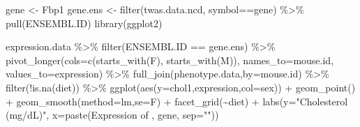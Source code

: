 \documentclass[
]{article}
\newenvironment{Shaded}{\begin{snugshade}}{\end{snugshade}}
\newcommand{\AttributeTok}[1]{\textcolor[rgb]{0.77,0.63,0.00}{#1}}
\newcommand{\FunctionTok}[1]{\textcolor[rgb]{0.00,0.00,0.00}{#1}}
\newcommand{\NormalTok}[1]{#1}
\newcommand{\OtherTok}[1]{\textcolor[rgb]{0.56,0.35,0.01}{#1}}
\newcommand{\SpecialCharTok}[1]{\textcolor[rgb]{0.00,0.00,0.00}{#1}}
\newcommand{\StringTok}[1]{\textcolor[rgb]{0.31,0.60,0.02}{#1}}
\begin{document}
\begin{Shaded}
\begin{Highlighting}[]
\NormalTok{gene }\OtherTok{\textless{}{-}} \StringTok{\textquotesingle{}Fbp1\textquotesingle{}}
\NormalTok{gene.ens }\OtherTok{\textless{}{-}} \FunctionTok{filter}\NormalTok{(twas.data.ncd, symbol}\SpecialCharTok{==}\NormalTok{gene) }\SpecialCharTok{\%\textgreater{}\%} \FunctionTok{pull}\NormalTok{(ENSEMBL.ID)}
\FunctionTok{library}\NormalTok{(ggplot2)}

\NormalTok{expression.data }\SpecialCharTok{\%\textgreater{}\%}
  \FunctionTok{filter}\NormalTok{(ENSEMBL.ID }\SpecialCharTok{==}\NormalTok{ gene.ens) }\SpecialCharTok{\%\textgreater{}\%}
  \FunctionTok{pivot\_longer}\NormalTok{(}\AttributeTok{cols=}\FunctionTok{c}\NormalTok{(}\FunctionTok{starts\_with}\NormalTok{(}\StringTok{\textquotesingle{}F\textquotesingle{}}\NormalTok{),}
                      \FunctionTok{starts\_with}\NormalTok{(}\StringTok{\textquotesingle{}M\textquotesingle{}}\NormalTok{)),}
               \AttributeTok{names\_to=}\StringTok{\textquotesingle{}mouse.id\textquotesingle{}}\NormalTok{,}
               \AttributeTok{values\_to=}\StringTok{\textquotesingle{}expression\textquotesingle{}}\NormalTok{) }\SpecialCharTok{\%\textgreater{}\%}
  \FunctionTok{full\_join}\NormalTok{(phenotype.data,}\AttributeTok{by=}\StringTok{\textquotesingle{}mouse.id\textquotesingle{}}\NormalTok{) }\SpecialCharTok{\%\textgreater{}\%}
  \FunctionTok{filter}\NormalTok{(}\SpecialCharTok{!}\FunctionTok{is.na}\NormalTok{(diet)) }\SpecialCharTok{\%\textgreater{}\%}
  \FunctionTok{ggplot}\NormalTok{(}\FunctionTok{aes}\NormalTok{(}\AttributeTok{y=}\NormalTok{chol1,expression,}\AttributeTok{col=}\NormalTok{sex)) }\SpecialCharTok{+}
  \FunctionTok{geom\_point}\NormalTok{() }\SpecialCharTok{+}
  \FunctionTok{geom\_smooth}\NormalTok{(}\AttributeTok{method=}\StringTok{\textquotesingle{}lm\textquotesingle{}}\NormalTok{,}\AttributeTok{se=}\NormalTok{F) }\SpecialCharTok{+}
  \FunctionTok{facet\_grid}\NormalTok{(}\SpecialCharTok{\textasciitilde{}}\NormalTok{diet) }\SpecialCharTok{+}
  \FunctionTok{labs}\NormalTok{(}\AttributeTok{y=}\StringTok{"Cholesterol (mg/dL)"}\NormalTok{,}
       \AttributeTok{x=}\FunctionTok{paste}\NormalTok{(}\StringTok{\textquotesingle{}Expression of \textquotesingle{}}\NormalTok{, gene, }\AttributeTok{sep=}\StringTok{""}\NormalTok{))}
\end{Highlighting}
\end{Shaded}
\end{document}
